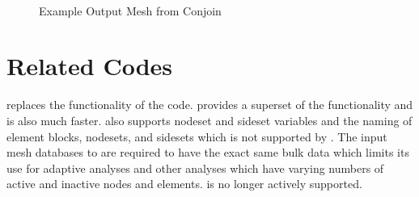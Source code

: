 \begin{figure}[ht]
\centering
{}
\\
\caption{Example Output Mesh from Conjoin}
\end{figure}

\section{Related Codes}
\conjoin{} replaces the functionality of the
\cite{bib:conex} code.  \conjoin{} provides a superset of
the  functionality and is also much faster. \conjoin{}
also supports nodeset and sideset variables and the naming of element
blocks, nodesets, and sidesets which is not supported by
. The input mesh databases to  are required to
have the exact same bulk data which limits its use for adaptive
analyses and other analyses which have varying numbers of active and
inactive nodes and elements.   is no longer actively
supported.
